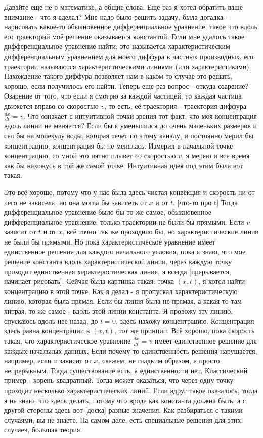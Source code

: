 Давайте еще не о математике, а общие слова. Еще раз я хотел обратить ваше внимание - что я сделал? Мне надо было решить задачу, была догадка - нарисовать какое-то обыкновенное дифференциальное уравнение, такое что вдоль его траекторий моё решение оказывается константой. Если мне удалось такое дифференциальное уравнение найти, это называется характеристическим дифференциальным уравнением для моего диффура в частных производных, его траектории называются характеристическими линиями (или характеристиками). Нахождение такого диффура позволяет нам в каком-то случае это решать, хорошо, если получилось его найти.
Теперь еще раз вопрос - откуда озарение? Озарение от того, что если я смотрю за каждой частицей, то каждая частица движется вправо со скоростью $v$, то есть, её траектория - траектория диффура $\frac{dx}{dt} = v$. Что означает с интуитивной точки зрения тот факт, что моя концентрация вдоль линии не меняется? Если бы я уменьшился до очень маленьких размеров и сел бы на молекулу воды, которая течет по этому каналу, и постоянно мерил бы концентрацию, концентрация бы не менялась. Измерил в начальной точке концентрацию, со мной это пятно плывет со скоростью $v$, я меряю и все время как бы нахожусь в той же самой точке. Интуитивная идея под этим была вот такая.

Это всё хорошо, потому что у нас была здесь чистая конвекция и скорость ни от чего не зависела, но она могла бы зависеть от $x$ и от $t$. [что-то про t] Тогда дифференциальное уравнение было бы то же самое, обыкновенное дифференциальное уравнение, только траектории не были бы прямыми. Если $v$ зависит от $t$ и от $x$, всё точно так же проходило бы, но характеристические линии не были бы прямыми. Но пока характеристическое уравнение имеет единственное решение для каждого начального условия, пока я знаю, что мое решение константа вдоль характеристической линии, через каждую точку проходит единственная характеристическая линия, я всегда [прерывается, начинает рисовать]. Сейчас была картинка такая: точка $(x, t)$, я хотел найти концентрацию в этой точке. Как я делал - я пропускал характеристическую линию, которая была прямая. Если бы линия была не прямая, а какая-то там хитрая, то же самое - вдоль этой линии константа. Я провожу эту линию, спускаюсь вдоль нее назад, до $t = 0$, здесь нахожу концентрацию. Концентрация здесь равна концентрации в $(x, t)$, тот же принцип. 
Всё хорошо, пока скорость такая, что характеристическое уравнение $\frac{dx}{dt} = v$ имеет единственное решение для каждых начальных данных. Если почему-то единственность решения нарушается, например, если $v$ зависит от $x$, скажем, не гладким образом, а просто непрерывным. Тогда существование есть, а единственности нет. Классический пример - корень квадратный. Тогда может оказаться, что через одну точку проходит несколько характеристических линий. Если вдруг такое оказалось, тогда я не знаю, что здесь делать, потому что вроде как константа должна быть, а с другой стороны здесь вот [доска] разные значения. Как разбираться с такими случаями, вы не знаете. На самом деле, есть специальные решения для этих случаев, большая теория.

